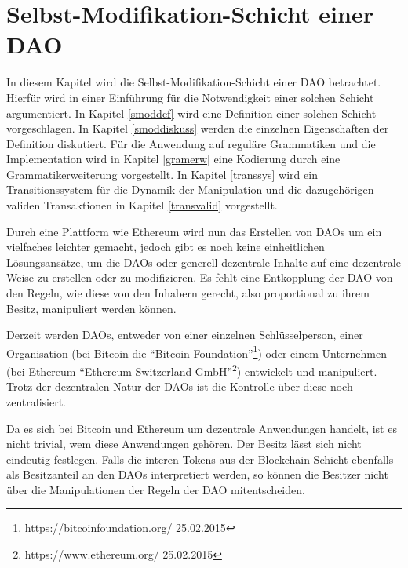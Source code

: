 \documentclass[a4paper,12pt]{report}
\begin{document}

\chapter{Selbst-Modifikation-Schicht einer DAO}
\label{selfMod}
In diesem Kapitel wird die Selbst-Modifikation-Schicht einer DAO betrachtet. Hierfür wird in einer Einführung für die Notwendigkeit einer solchen Schicht argumentiert. In Kapitel \ref{smoddef} wird eine Definition einer solchen Schicht vorgeschlagen. In Kapitel \ref{smoddiskuss} werden die einzelnen Eigenschaften der Definition diskutiert. Für die Anwendung auf reguläre Grammatiken und die Implementation wird in Kapitel \ref{gramerw} eine Kodierung durch eine Grammatikerweiterung vorgestellt. In Kapitel \ref{transsys} wird ein Transitionssystem für die Dynamik der Manipulation und die dazugehörigen validen Transaktionen in Kapitel \ref{transvalid} vorgestellt.

Durch eine Plattform wie Ethereum wird nun das Erstellen von DAOs um ein vielfaches leichter gemacht, jedoch gibt es noch keine einheitlichen Lösungsansätze, um die DAOs oder generell dezentrale Inhalte auf eine dezentrale Weise zu erstellen oder zu modifizieren. Es fehlt eine Entkopplung der DAO von den Regeln, wie diese von den Inhabern gerecht, also proportional zu ihrem Besitz, manipuliert werden können.

Derzeit werden DAOs, entweder von einer einzelnen Schlüsselperson, einer Organisation (bei Bitcoin die ``Bitcoin-Foundation''\footnote{https://bitcoinfoundation.org/ 25.02.2015}) oder einem Unternehmen (bei Ethereum ``Ethereum Switzerland GmbH''\footnote{https://www.ethereum.org/ 25.02.2015}) entwickelt und manipuliert. Trotz der dezentralen Natur der DAOs ist die Kontrolle über diese noch zentralisiert. 

Da es sich bei Bitcoin und Ethereum um dezentrale Anwendungen handelt, ist es nicht trivial, wem diese Anwendungen gehören. Der Besitz lässt sich nicht eindeutig festlegen. Falls die interen Tokens aus der Blockchain-Schicht ebenfalls als Besitzanteil an den DAOs interpretiert werden, so können die Besitzer nicht über die Manipulationen der Regeln der DAO mitentscheiden.
\end{document}
